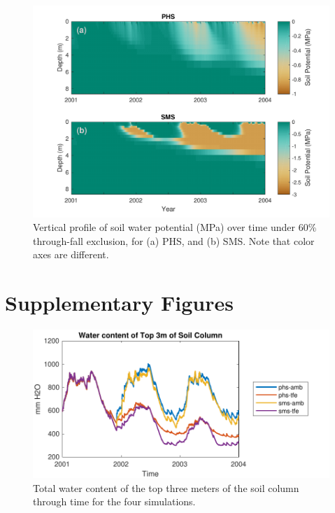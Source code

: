 \documentclass[draft,linenumbers]{agujournal}
\begin{document}
  
      \clearpage
    \begin{figure}[h]
     \centering
     \includegraphics[width=30pc]{../figs2/fig11.pdf}
     \caption{Vertical profile of soil water potential (MPa) over time under 60\% through-fall exclusion, for
     (a) PHS, and 
     (b) SMS.
     Note that color axes are different. }
     \label{fig:sm}
  \end{figure}


\clearpage

\appendix

\section{Supplementary Figures}

      \begin{figure}[h]
     \centering
     \includegraphics[width=30pc]{../figs2/top3m.pdf}
     \caption{Total water content of the top three meters of the soil column through time for the four simulations.}
     \label{top3m}
  \end{figure}
  \clearpage
  
\end{document}
